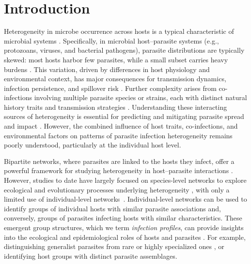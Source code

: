 \documentclass[oneside, a4paper, onecolumn, 11pt]{article}
\begin{document}
\clearpage

\section*{Introduction}
Heterogeneity in microbe occurrence across hosts is a typical characteristic of microbial systems \citep{Zaoli2021-xm,Zhang2014-ab}. Specifically, in microbial host–parasite systems (e.g., protozoans, viruses, and bacterial pathogens), parasite distributions are typically skewed: most hosts harbor few parasites, while a small subset carries heavy burdens \citep{Poulin2007-oi, Tompkins2011-ir, Zhang2014-ab}. This variation, driven by differences in host physiology and environmental context, has major consequences for transmission dynamics, infection persistence, and spillover risk \citep{VanderWaal2016-be, Paull2012-lw, Trauer2019-ab, Gomes2022-ho, Stewart-Merrill2021-xs}. Further complexity arises from co-infections involving multiple parasite species or strains, each with distinct natural history traits and transmission strategies \citep{Sherry2024-ue, Pedersen2007-mv, Venter2022-gu}. Understanding these interacting sources of heterogeneity is essential for predicting and mitigating parasite spread and impact \citep{Johnson2015-iw}. However, the combined influence of host traits, co-infections, and environmental factors on patterns of parasite infection heterogeneity remains poorly understood, particularly at the individual host level.

Bipartite networks, where parasites are linked to the hosts they infect, offer a powerful framework for studying heterogeneity in host–parasite interactions \citep{Runghen2021-hp}. However, studies to date have largely focused on species-level networks to explore ecological and evolutionary processes underlying heterogeneity \citep{Bordes2015-wt, Dallas2021-ua, Lima2012-am,Dallas2019-tx}, with only a limited use of individual-level networks~\citep{Pilosof2015-rw}. Individual-level networks can be used to identify groups of individual hosts with similar parasite associations and, conversely, groups of parasites infecting hosts with similar characteristics. These emergent group structures, which we term \textit{infection profiles}, can provide insights into the ecological and epidemiological roles of hosts and parasites \citep{Allesina2009-ra, Rosvall2018-jg}. For example, distinguishing generalist parasites from rare or highly specialized ones \citep{Poulin2011-wb}, or identifying host groups with distinct parasite assemblages.
\end{document}
